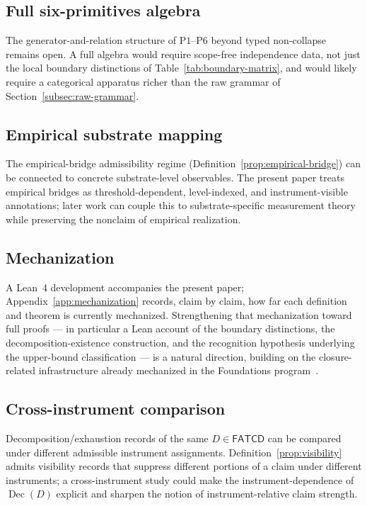 \documentclass[11pt]{article}
\theoremstyle{definition}
\newcommand{\FATCD}{\ensuremath{\mathsf{FATCD}}}
\newcommand{\Dec}[1]{\ensuremath{\operatorname{Dec}\!\left(#1\right)}}
\newcommand{\Pone}{\ensuremath{\mathrm{P1}}}
\newcommand{\Psix}{\ensuremath{\mathrm{P6}}}
\begin{document}
\subsection{Full six-primitives algebra}\label{subsec:future-algebra}

The generator-and-relation structure of \Pone{}--\Psix{} beyond
typed non-collapse remains open. A full algebra would require
scope-free independence data, not just the local boundary
distinctions of Table~\ref{tab:boundary-matrix}, and would likely
require a categorical apparatus richer than the raw grammar of
Section~\ref{subsec:raw-grammar}.

\subsection{Empirical substrate mapping}\label{subsec:future-substrate}

The empirical-bridge admissibility regime
(Definition~\ref{prop:empirical-bridge}) can be connected to
concrete substrate-level observables. The present paper treats
empirical bridges as threshold-dependent, level-indexed, and
instrument-visible annotations; later work can couple this to
substrate-specific measurement theory while preserving the nonclaim
of empirical realization.

\subsection{Mechanization}\label{subsec:future-mechanization}

A Lean~4 development accompanies the present paper;
Appendix~\ref{app:mechanization} records, claim by claim, how far each definition
and theorem is currently mechanized. Strengthening that mechanization toward full
proofs --- in particular a Lean account of the boundary distinctions, the
decomposition-existence construction, and the recognition hypothesis underlying
the upper-bound classification --- is a natural direction, building on the
closure-related infrastructure already mechanized in the Foundations
program~\citep{Tsiokos2026SixBirdsFoundations,DeMouraUllrich2021}.

\subsection{Cross-instrument comparison}\label{subsec:future-cross-instrument}

Decomposition/exhaustion records of the same \(D \in \FATCD{}\) can
be compared under different admissible instrument assignments.
Definition~\ref{prop:visibility} admits visibility records that
suppress different portions of a claim under different instruments; a
cross-instrument study could make the instrument-dependence of
\(\Dec{D}\) explicit and sharpen the notion of instrument-relative
claim strength.
 
\end{document}
